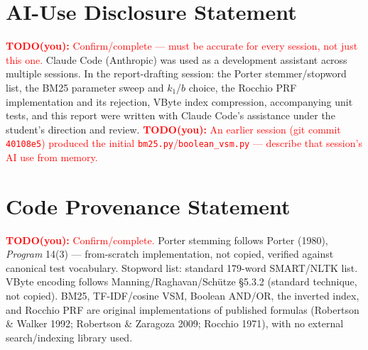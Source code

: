 \documentclass[10pt]{article}
\newcommand{\todo}[1]{\textcolor{red}{\textbf{TODO(you):} #1}}
\begin{document}
\section{AI-Use Disclosure Statement}
\todo{Confirm/complete --- must be accurate for every session, not just this one.} Claude Code (Anthropic) was used as a development assistant across multiple sessions. In the report-drafting session: the Porter stemmer/stopword list, the BM25 parameter sweep and $k_1$/$b$ choice, the Rocchio PRF implementation and its rejection, VByte index compression, accompanying unit tests, and this report were written with Claude Code's assistance under the student's direction and review. \todo{An earlier session (git commit \texttt{40108e5}) produced the initial \texttt{bm25.py}/\texttt{boolean\_vsm.py} --- describe that session's AI use from memory.}

\section{Code Provenance Statement}
\todo{Confirm/complete.} Porter stemming follows Porter (1980), \emph{Program} 14(3) --- from-scratch implementation, not copied, verified against canonical test vocabulary. Stopword list: standard 179-word SMART/NLTK list. VByte encoding follows Manning/Raghavan/Sch\"utze \S5.3.2 (standard technique, not copied). BM25, TF-IDF/cosine VSM, Boolean AND/OR, the inverted index, and Rocchio PRF are original implementations of published formulas (Robertson \& Walker 1992; Robertson \& Zaragoza 2009; Rocchio 1971), with no external search/indexing library used.
\end{document}
